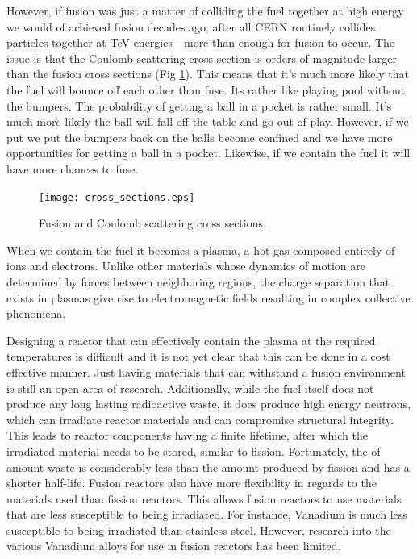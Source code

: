However, if fusion was just a matter of colliding the fuel together at high energy we would of achieved fusion decades ago; after all CERN routinely collides particles together at TeV energies---more than enough for fusion to occur. The issue is that the Coulomb scattering cross section is orders of magnitude larger than the fusion cross sections (Fig \ref{fig:scattering}). This means that it's much more likely that the fuel will bounce off each other than fuse. Its rather like playing pool without the bumpers. The probability of getting a ball in a pocket is rather small. It's much more likely the ball will fall off the table and go out of play. However, if we put we put the bumpers back on the balls become confined and we have more opportunities for getting a ball in a pocket. Likewise, if we contain the fuel it will have more chances to fuse.
\begin{figure}[ht]
    \centering
    \texttt{[image: cross\_sections.eps]}
    \caption{Fusion and Coulomb scattering cross sections.}
    \label{fig:scattering}
\end{figure}
When we contain the fuel it becomes a plasma, a hot gas composed entirely of ions and electrons. Unlike other materials whose dynamics of motion are determined by forces between neighboring regions, the charge separation that exists in plasmas give rise to electromagnetic fields resulting in complex collective phenomena.

Designing a reactor that can effectively contain the plasma at the required temperatures is difficult and it is not yet clear that this can be done in a cost effective manner. Just having materials that can withstand a fusion environment is still an open area of research. Additionally, while the fuel itself does not produce any long lasting radioactive waste, it does produce high energy neutrons, which can irradiate reactor materials and can compromise structural integrity. This leads to reactor components having a finite lifetime, after which the irradiated material needs to be stored, similar to fission. Fortunately, the of amount waste is considerably less than the amount produced by fission and has a shorter half-life. Fusion reactors also have more flexibility in regards to the materials used than fission reactors. This allows fusion reactors to use materials that are less susceptible to being irradiated. For instance, Vanadium is much less susceptible to being irradiated than stainless steel. However, research into the various Vanadium alloys for use in fusion reactors has been limited. 

